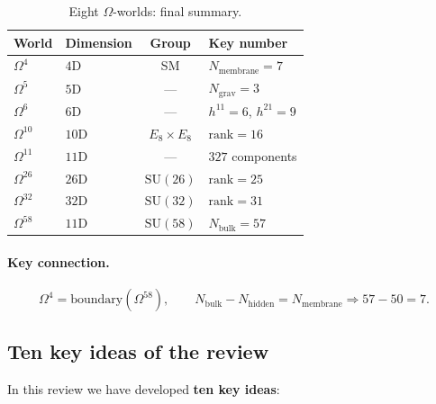 \documentclass[11pt,a4paper]{article}
\newcommand{\SU}{\mathrm{SU}}
\newcommand{\Om}{\Omega^4}
\newcommand{\Omf}{\Omega^5}
\newcommand{\Oms}{\Omega^6}
\newcommand{\Omt}{\Omega^{10}}
\newcommand{\Ome}{\Omega^{11}}
\newcommand{\Omtw}{\Omega^{26}}
\newcommand{\Omth}{\Omega^{32}}
\newcommand{\Omfi}{\Omega^{58}}
\newcommand{\Nbulk}{N_{\text{bulk}}}
\newcommand{\Nhidden}{N_{\text{hidden}}}
\newcommand{\Nmembrane}{N_{\text{membrane}}}
\theoremstyle{definition}
\begin{document}
\begin{table}[htbp]
\centering
\caption{Eight $\Omega$-worlds: final summary.}
\label{tab:conclusions-eight-worlds}
\begin{tabular}{llcl}
\toprule
World & Dimension & Group & Key number \\
\midrule
$\Om$ & $4$D & SM & $\Nmembrane = 7$ \\
$\Omf$ & $5$D & --- & $N_{\text{grav}} = 3$ \\
$\Oms$ & $6$D & --- & $h^{11} = 6$, $h^{21} = 9$ \\
$\Omt$ & $10$D & $E_8 \times E_8$ & $\mathrm{rank} = 16$ \\
$\Ome$ & $11$D & --- & $327$ components \\
$\Omtw$ & $26$D & $\SU(26)$ & $\mathrm{rank} = 25$ \\
$\Omth$ & $32$D & $\SU(32)$ & $\mathrm{rank} = 31$ \\
$\Omfi$ & $11$D & $\SU(58)$ & $\Nbulk = 57$ \\
\bottomrule
\end{tabular}
\end{table}

\paragraph{Key connection.}
\begin{equation}
    \boxed{
    \Om = \text{boundary}(\Omfi), \qquad
    \Nbulk - \Nhidden = \Nmembrane \Rightarrow 57 - 50 = 7.
    }
\end{equation}

\subsection{Ten key ideas of the review}
\label{subsec:conclusions-ten-ideas}

In this review we have developed \textbf{ten key ideas}:
\end{document}
